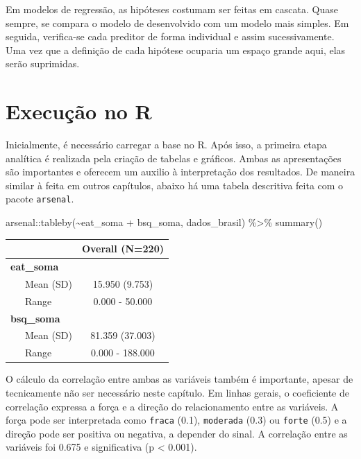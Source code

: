 \documentclass[
]{book}
\newenvironment{Shaded}{\begin{snugshade}}{\end{snugshade}}
\newcommand{\FunctionTok}[1]{\textcolor[rgb]{0.00,0.00,0.00}{#1}}
\newcommand{\NormalTok}[1]{#1}
\newcommand{\SpecialCharTok}[1]{\textcolor[rgb]{0.00,0.00,0.00}{#1}}
\begin{document}
Em modelos de regressão, as hipóteses costumam ser feitas em cascata. Quase sempre, se compara o modelo de desenvolvido com um modelo mais simples. Em seguida, verifica-se cada preditor de forma individual e assim sucessivamente. Uma vez que a definição de cada hipótese ocuparia um espaço grande aqui, elas serão suprimidas.

\hypertarget{execuuxe7uxe3o-no-r-14}{%
\section{Execução no R}\label{execuuxe7uxe3o-no-r-14}}

Inicialmente, é necessário carregar a base no R. Após isso, a primeira etapa analítica é realizada pela criação de tabelas e gráficos. Ambas as apresentações são importantes e oferecem um auxilio à interpretação dos resultados. De maneira similar à feita em outros capítulos, abaixo há uma tabela descritiva feita com o pacote \texttt{arsenal}.

\begin{Shaded}
\begin{Highlighting}[]
\NormalTok{arsenal}\SpecialCharTok{::}\FunctionTok{tableby}\NormalTok{(}\SpecialCharTok{\textasciitilde{}}\NormalTok{eat\_soma }\SpecialCharTok{+}\NormalTok{ bsq\_soma, dados\_brasil) }\SpecialCharTok{\%\textgreater{}\%} 
  \FunctionTok{summary}\NormalTok{() }
\end{Highlighting}
\end{Shaded}

\begin{longtable}[]{@{}lc@{}}
\toprule
& Overall (N=220) \\
\midrule
\endhead
\textbf{eat\_soma} & \\
~~~Mean (SD) & 15.950 (9.753) \\
~~~Range & 0.000 - 50.000 \\
\textbf{bsq\_soma} & \\
~~~Mean (SD) & 81.359 (37.003) \\
~~~Range & 0.000 - 188.000 \\
\bottomrule
\end{longtable}

O cálculo da correlação entre ambas as variáveis também é importante, apesar de tecnicamente não ser necessário neste capítulo. Em linhas gerais, o coeficiente de correlação expressa a força e a direção do relacionamento entre as variáveis. A força pode ser interpretada como \texttt{fraca} (0.1), \texttt{moderada} (0.3) ou \texttt{forte} (0.5) \citep{Cohen1988} e a direção pode ser positiva ou negativa, a depender do sinal. A correlação entre as variáveis foi 0.675 e significativa (p \textless{} 0.001).
\end{document}
